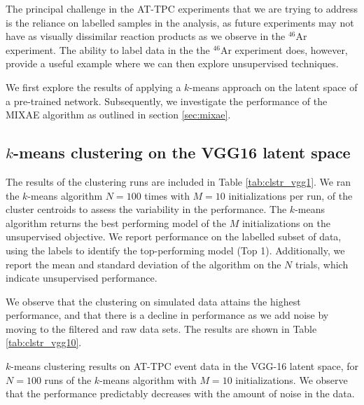 \documentclass[preprint,12pt]{elsarticle}
\begin{document}
The principal challenge in the AT-TPC experiments that we are trying to address is the reliance on labelled samples in the analysis, as future experiments may not have as visually dissimilar reaction products as we observe in the ${}^{46}$Ar experiment.  The ability to label data in the the ${}^{46}$Ar experiment does, however, provide a useful example where we can then explore unsupervised techniques. 

We first explore the results of applying a $k$-means approach on the latent space of a pre-trained network. Subsequently, we investigate the performance of the MIXAE algorithm as outlined in section \ref{sec:mixae}.

\subsection{$k$-means clustering on the VGG16 latent space}\label{sec:kmeans_results}

The results of the clustering runs are included in Table \ref{tab:clstr_vgg1}. We ran the $k$-means algorithm $N=100$ times with $M=10$ initializations per run, of the cluster centroids to assess the variability in the performance. The $k$-means algorithm returns the best performing model of the $M$ initializations on the unsupervised objective. We report performance on the labelled subset of data, using the labels to identify the top-performing model (Top 1). Additionally, we report the mean and standard deviation of the algorithm on the $N$ trials, which indicate unsupervised performance.   


We observe that the clustering on simulated data attains the highest performance, and that there is a decline in performance as we add noise by moving to the filtered and raw data sets. The results are shown in Table \ref{tab:clstr_vgg10}. 

\begin{table}[H]
\centering 
\caption[$k$-means on pre-trained model]{$k$-means clustering results on AT-TPC event data in the VGG-16 latent space, for $N=100$ runs of the $k$-means algorithm with $M=10$ initializations. We observe that the performance predictably decreases with the amount of noise in the data.}\label{tab:clstr_vgg10}

\end{table}
\end{document}
